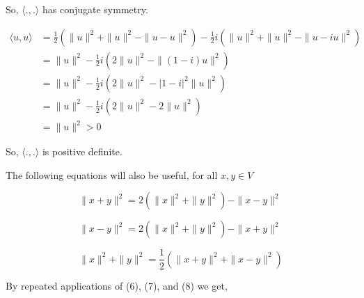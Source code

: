 \documentclass{article}
\begin{document}
So, $\langle .,. \rangle$ has conjugate symmetry.

\begin{align*}
  \langle u,u \rangle &= {\frac
    {1}{2}}\left( \|u\|^2+\|u\|^2 -
     \|u-u\|^2 \right) -{\frac
    {1}{2}}i\left(
                        \|u\|^2+\|u\|^2 - \|u-iu\|^2 \right) \\
  &=
    \|u\|^2 -{\frac
    {1}{2}}i\left(
    2\|u\|^2 - \|(1-i)u\|^2 \right) \\
  &= \|u\|^2 -{\frac
    {1}{2}}i\left(
    2\|u\|^2 - |1-i|^2\|u\|^2 \right) \\
  &= \|u\|^2 -{\frac
    {1}{2}}i\left(
      2\|u\|^2 - 2\|u\|^2 \right) \\
  &=\|u\|^2 > 0
\end{align*}

So, $\langle .,. \rangle$ is positive definite.

\newpage
The following equations will also be useful, for all $x,y \in V$

\begin{equation}
  \|x+y\|^2 = 2\left( \|x\|^2+\|y\|^2\right) - \|x-y\|^2\,
\end{equation}

\begin{equation}
  \|x-y\|^2 = 2\left( \|x\|^2+\|y\|^2\right) - \|x+y\|^2\,
\end{equation}

\begin{equation}
  \|x\|^2+\|y\|^2 = \frac{1}{2}\left(  \|x+y\|^2 + \|x-y\|^2\right)
\end{equation}

By repeated applications of (6), (7), and (8) we get,
\end{document}
